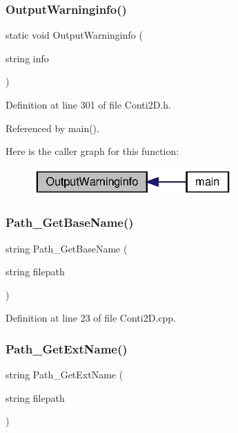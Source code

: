 \subsubsection{Output\+Warninginfo()}
{\footnotesize\ttfamily static void Output\+Warninginfo (\begin{DoxyParamCaption}\item[{string}]{info }\end{DoxyParamCaption})\hspace{0.3cm}{\ttfamily [static]}}



Definition at line 301 of file Conti2\+D.\+h.



Referenced by main().

Here is the caller graph for this function\+:\nopagebreak
\begin{figure}[H]
\begin{center}
\leavevmode
\includegraphics[width=217pt]{Conti2D_8h_af6e0e75c33384cc17e08626d17dc381d_af6e0e75c33384cc17e08626d17dc381d_icgraph}
\end{center}
\end{figure}
\mbox{\label{Conti2D_8h_a3c05f14aad4d9edc8c97ce180341a758_a3c05f14aad4d9edc8c97ce180341a758}} 
\subsubsection{Path\+\_\+\+Get\+Base\+Name()}
{\footnotesize\ttfamily string Path\+\_\+\+Get\+Base\+Name (\begin{DoxyParamCaption}\item[{string}]{filepath }\end{DoxyParamCaption})}



Definition at line 23 of file Conti2\+D.\+cpp.

\mbox{\label{Conti2D_8h_aaea96ecea3031c19d3ef88f6f1590d4a_aaea96ecea3031c19d3ef88f6f1590d4a}} 
\subsubsection{Path\+\_\+\+Get\+Ext\+Name()}
{\footnotesize\ttfamily string Path\+\_\+\+Get\+Ext\+Name (\begin{DoxyParamCaption}\item[{string}]{filepath }\end{DoxyParamCaption})}



